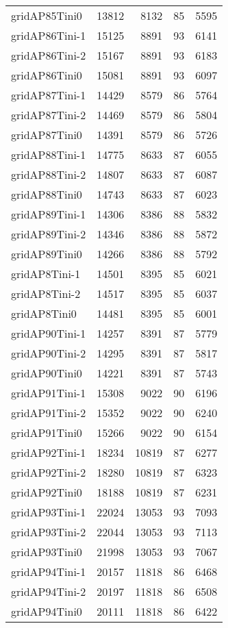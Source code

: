 \begin{longtable}{lrrrr}
gridAP85Tini0 & 13812 & 8132 & 85 & 5595 \\
gridAP86Tini-1 & 15125 & 8891 & 93 & 6141 \\
gridAP86Tini-2 & 15167 & 8891 & 93 & 6183 \\
gridAP86Tini0 & 15081 & 8891 & 93 & 6097 \\
gridAP87Tini-1 & 14429 & 8579 & 86 & 5764 \\
gridAP87Tini-2 & 14469 & 8579 & 86 & 5804 \\
gridAP87Tini0 & 14391 & 8579 & 86 & 5726 \\
gridAP88Tini-1 & 14775 & 8633 & 87 & 6055 \\
gridAP88Tini-2 & 14807 & 8633 & 87 & 6087 \\
gridAP88Tini0 & 14743 & 8633 & 87 & 6023 \\
gridAP89Tini-1 & 14306 & 8386 & 88 & 5832 \\
gridAP89Tini-2 & 14346 & 8386 & 88 & 5872 \\
gridAP89Tini0 & 14266 & 8386 & 88 & 5792 \\
gridAP8Tini-1 & 14501 & 8395 & 85 & 6021 \\
gridAP8Tini-2 & 14517 & 8395 & 85 & 6037 \\
gridAP8Tini0 & 14481 & 8395 & 85 & 6001 \\
gridAP90Tini-1 & 14257 & 8391 & 87 & 5779 \\
gridAP90Tini-2 & 14295 & 8391 & 87 & 5817 \\
gridAP90Tini0 & 14221 & 8391 & 87 & 5743 \\
gridAP91Tini-1 & 15308 & 9022 & 90 & 6196 \\
gridAP91Tini-2 & 15352 & 9022 & 90 & 6240 \\
gridAP91Tini0 & 15266 & 9022 & 90 & 6154 \\
gridAP92Tini-1 & 18234 & 10819 & 87 & 6277 \\
gridAP92Tini-2 & 18280 & 10819 & 87 & 6323 \\
gridAP92Tini0 & 18188 & 10819 & 87 & 6231 \\
gridAP93Tini-1 & 22024 & 13053 & 93 & 7093 \\
gridAP93Tini-2 & 22044 & 13053 & 93 & 7113 \\
gridAP93Tini0 & 21998 & 13053 & 93 & 7067 \\
gridAP94Tini-1 & 20157 & 11818 & 86 & 6468 \\
gridAP94Tini-2 & 20197 & 11818 & 86 & 6508 \\
gridAP94Tini0 & 20111 & 11818 & 86 & 6422 \\

\end{longtable}
